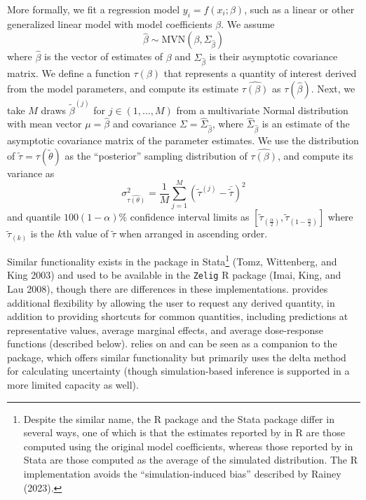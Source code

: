 More formally, we fit a regression model \(y_i = f(x_i; \beta)\), such as a linear or other generalized linear model with model coefficients \(\beta\). We assume\[
\hat{\beta} \sim \text{MVN}(\beta, \Sigma_{\hat{\beta}})
\]where \(\hat{\beta}\) is the vector of estimates of \(\beta\) and \(\Sigma_{\hat{\beta}}\) is their asymptotic covariance matrix. We define a function \(\tau(\beta)\) that represents a quantity of interest derived from the model parameters, and compute its estimate \(\widehat{\tau(\beta)}\) as \(\tau(\hat{\beta})\). Next, we take \(M\) draws \(\tilde{\beta}^{(j)}\) for \(j\in(1, \dots, M)\) from a multivariate Normal distribution with mean vector \(\mu = \hat{\beta}\) and covariance \(\Sigma = \hat{\Sigma}_{\hat{\beta}}\), where \(\hat{\Sigma}_{\hat{\beta}}\) is an estimate of the asymptotic covariance matrix of the parameter estimates. We use the distribution of \(\tilde{\tau}=\tau(\tilde{\theta})\) as the ``posterior'' sampling distribution of \(\widehat{\tau(\beta)}\), and compute its variance as\[
\sigma^2_{\widehat{\tau(\theta)}} = \frac{1}{M}\sum^M_{j=1}{(\tilde{\tau}^{(j)} - \bar{\tilde{\tau}})^2}
\]and quantile \(100(1-\alpha)\%\) confidence interval limits as \(\left[\tilde{\tau}_{(\frac{\alpha}{2})}, \tilde{\tau}_{(1-\frac{\alpha}{2})}\right]\) where \(\tilde{\tau}_{(k)}\) is the \(k\)th value of \(\tilde{\tau}\) when arranged in ascending order.

Similar functionality exists in the  package in Stata\footnote{Despite the similar name, the R package  and the Stata package  differ in several ways, one of which is that the estimates reported by  in R are those computed using the original model coefficients, whereas those reported by  in Stata are those computed as the average of the simulated distribution. The R implementation avoids the ``simulation-induced bias'' described by Rainey (2023).} (Tomz, Wittenberg, and King 2003) and used to be available in the \texttt{Zelig} R package (Imai, King, and Lau 2008), though there are differences in these implementations.  provides additional flexibility by allowing the user to request any derived quantity, in addition to providing shortcuts for common quantities, including predictions at representative values, average marginal effects, and average dose-response functions (described below).  relies on and can be seen as a companion to the  package, which offers similar functionality but primarily uses the delta method for calculating uncertainty (though simulation-based inference is supported in a more limited capacity as well).

